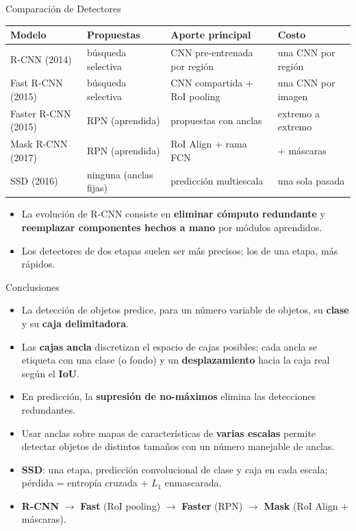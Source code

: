 \documentclass[aspectratio=169, 10pt]{beamer}
\begin{document}
\begin{frame}{Comparación de Detectores}
	\begin{center}
		\footnotesize
		\begin{tabular}{llll}
			\toprule
			\textbf{Modelo} & \textbf{Propuestas} & \textbf{Aporte principal} & \textbf{Costo} \\
			\midrule
			R-CNN (2014) & búsqueda selectiva & CNN pre-entrenada por región & una CNN por región \\
			Fast R-CNN (2015) & búsqueda selectiva & CNN compartida + RoI pooling & una CNN por imagen \\
			Faster R-CNN (2015) & RPN (aprendida) & propuestas con anclas & extremo a extremo \\
			Mask R-CNN (2017) & RPN (aprendida) & RoI Align + rama FCN & + máscaras \\
			\midrule
			SSD (2016) & ninguna (anclas fijas) & predicción multiescala & una sola pasada \\
			\bottomrule
		\end{tabular}
	\end{center}
	\vspace{0.3cm}
	\begin{itemize}
		\item La evolución de R-CNN consiste en \textbf{eliminar cómputo redundante} y \textbf{reemplazar componentes hechos a mano} por módulos aprendidos.
		\item Los detectores de dos etapas suelen ser más precisos; los de una etapa, más rápidos.
	\end{itemize}
\end{frame}

\begin{frame}{Conclusiones}
	\begin{itemize}
		\item La detección de objetos predice, para un número variable de objetos, su \textbf{clase} y su \textbf{caja delimitadora}.
		\item Las \textbf{cajas ancla} discretizan el espacio de cajas posibles; cada ancla se etiqueta con una clase (o fondo) y un \textbf{desplazamiento} hacia la caja real según el \textbf{IoU}.
		\item En predicción, la \textbf{supresión de no-máximos} elimina las detecciones redundantes.
		\item Usar anclas sobre mapas de características de \textbf{varias escalas} permite detectar objetos de distintos tamaños con un número manejable de anclas.
		\item \textbf{SSD}: una etapa, predicción convolucional de clase y caja en cada escala; pérdida = entropía cruzada + $L_1$ enmascarada.
		\item \textbf{R-CNN} $\rightarrow$ \textbf{Fast} (RoI pooling) $\rightarrow$ \textbf{Faster} (RPN) $\rightarrow$ \textbf{Mask} (RoI Align + máscaras).
	\end{itemize}
\end{frame}
\end{document}
